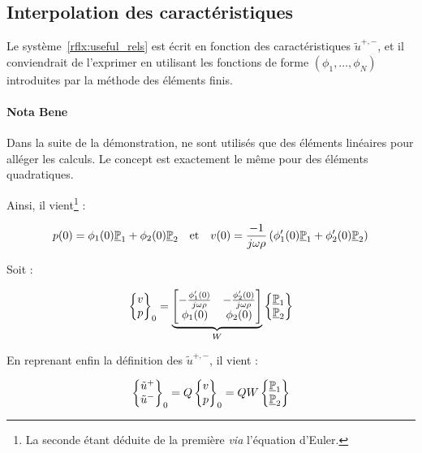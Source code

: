 \subsection{Interpolation des caractéristiques}

Le système~\eqref{rflx:useful_rels} est écrit en fonction des caractéristiques $\tilde{u}^{+,-}$, et il conviendrait de
l'exprimer en utilisant les fonctions de forme $(\phi_1, \ldots, \phi_N)$ introduites par la méthode des éléments finis.
\paragraph{Nota Bene} Dans la suite de la démonstration, ne sont utilisés que des éléments linéaires pour alléger les
calculs. Le concept est exactement le même pour des éléments quadratiques.

Ainsi, il vient\footnote{La seconde étant déduite de la première \textit{via} l'équation d'Euler.} :

\begin{equation*}
	p(0) = \phi_1(0)\underline{\mathbb{P}}_1 + \phi_2(0)\underline{\mathbb{P}}_2 \quad\mathrm{et}\quad v(0) = \frac{-1}{j\omega\rho}\left(\phi'_1(0)\underline{\mathbb{P}}_1 +
		\phi'_2(0)\underline{\mathbb{P}}_2\right)
\end{equation*}

Soit :

\begin{equation*}
	\begin{Bmatrix}v\\p\end{Bmatrix}_0 = \underbrace{\begin{bmatrix}
		-\frac{\phi'_1(0)}{j\omega\rho} & -\frac{\phi'_2(0)}{j\omega\rho}\\
		\phi_1(0) & \phi_2(0)
\end{bmatrix}}_{W}
	\begin{Bmatrix}
		\underline{\mathbb{P}}_1\\\underline{\mathbb{P}}_2
	\end{Bmatrix}
\end{equation*}

En reprenant enfin la définition des $\tilde{u}^{+,-}$, il vient :

\begin{equation}
\begin{Bmatrix}
	\tilde{u}^+\\\tilde{u}^-
\end{Bmatrix}_0 = Q\begin{Bmatrix}
	v\\p
\end{Bmatrix}_0 = QW\begin{Bmatrix}\underline{\mathbb{P}}_1\\\underline{\mathbb{P}}_2\end{Bmatrix}
\end{equation}


